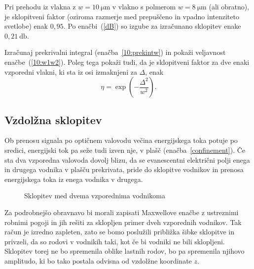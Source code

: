 Pri prehodu iz vlakna z $w = 10~\si{\micro\meter}$ v vlakno
s polmerom $w = 8~\si{\micro\meter}$ (ali obratno), je sklopitveni faktor (oziroma
razmerje med prepuščeno in vpadno intenziteto svetlobe) enak $0,95$. Po enačbi~(\ref{dB})
so izgube za izračunano sklopitev enake $0,21~\si{\decibel}$. 

\begin{definition}
Izračunaj prekrivalni integral (enačba~\ref{10:prekintw}) in pokaži veljavnost enačbe~(\ref{10:w1w2}).
Poleg tega pokaži tudi, da je sklopitveni faktor za dve enaki vzporedni vlakni, ki sta iz osi izmaknjeni
za $\Delta$, enak
\begin{equation}
\eta = \exp \left( - \frac{\Delta^2}{w^2}\right).
\end{equation}

\end{definition}
\subsection*{Vzdolžna sklopitev}
Ob prenosu signala po optičnem valovodu večina energijskega toka potuje po sredici,
energijski tok pa seže tudi izven nje, v plašč (enačba~\ref{confinement}). 
Če sta dva vzporedna valovoda dovolj blizu, da
se evanescentni električni polji enega in drugega vodnika v plašču prekrivata, pride do 
sklopitve vodnikov in prenosa energijskega toka iz enega vodnika v drugega. 
\begin{figure}[h]
\centering
\def\svgwidth{80truemm} 
 
\caption{Sklopitev med dvema vzporednima vodnikoma}
\label{fig:fcoupler}
\end{figure}

Za podrobnejšo obravnavo bi morali zapisati Maxwellove enačbe z ustreznimi robnimi pogoji 
in jih rešiti za sklopljen primer dveh vzporednih vodnikov. Tak račun je izredno zapleten, 
zato se bomo poslužili približka šibke sklopitve in privzeli, da so rodovi v vodnikih taki, 
kot če bi vodniki ne bili sklopljeni.
Sklopitev torej ne bo spremenila oblike lastnih rodov, bo pa spremenila njihovo amplitudo, ki 
bo tako postala odvisna od vzdolžne koordinate $z$.

